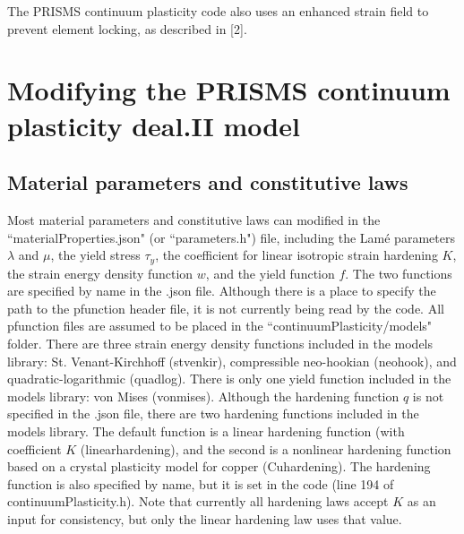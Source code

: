 \documentclass[10pt]{article}
\begin{document}
The PRISMS continuum plasticity code also uses an enhanced strain field to prevent element locking, as described in [2].

\pagebreak

\section{Modifying the PRISMS continuum plasticity deal.II model}

\subsection{Material parameters and constitutive laws}
Most material parameters and constitutive laws can modified in the ``materialProperties.json" (or ``parameters.h") file, including the Lam\'e parameters $\lambda$ and $\mu$, the yield stress $\tau_y$, the coefficient for linear isotropic strain hardening $K$, the strain energy density function $w$, and the yield function $f$. The two functions are specified by name in the .json file. Although there is a place to specify the path to the pfunction header file, it is not currently being read by the code. All pfunction files are assumed to be placed in the ``continuumPlasticity/models" folder. There are three strain energy density functions included in the models library: St. Venant-Kirchhoff (stvenkir), compressible neo-hookian (neohook), and quadratic-logarithmic (quadlog). There is only one yield function included in the models library: von Mises (von\textunderscore mises). Although the hardening function $q$ is not specified in the .json file, there are two hardening functions included in the models library. The default function is a linear hardening function (with coefficient $K$ (linear\textunderscore hardening), and the second is a nonlinear hardening function based on a crystal plasticity model for copper (Cu\textunderscore hardening). The hardening function is also specified by name, but it is set in the code (line 194 of continuumPlasticity.h). Note that currently all hardening laws accept $K$ as an input for consistency, but only the linear hardening law uses that value.
\end{document}
